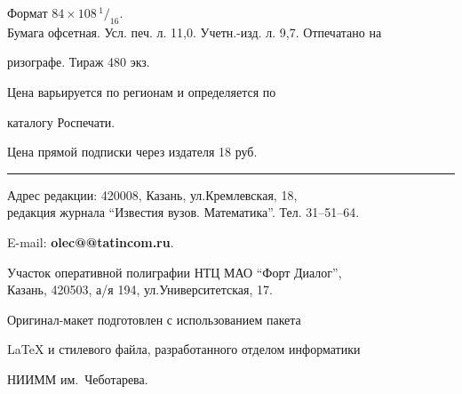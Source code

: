 Формат $84\times 108 \,^1/_{16}.$\\


Бумага офсетная. Усл. печ. л. 11,0. Учетн.-изд. л. 9,7. Отпечатано на 


ризографе. Тираж 480 экз. 





\noindent Цена варьируется по регионам и определяется по 


каталогу Роспечати. 





\noindent Цена прямой подписки через издателя 18 руб. 


\bigskip


\hrule


\bigskip


\noindent Адрес редакции: 420008, Казань, ул.Кремлевская, 18,\\  


редакция журнала  ``Известия вузов. Математика''. Тел. 31--51--64.





\noindent E-mail: {\bf olec@@tatincom.ru}. \par


\bigskip 


\noindent Участок оперативной полиграфии НТЦ МАО  ``Форт Диалог'', \\


Казань, 420503, а/я 194, ул.Университетская, 17. \par


\bigskip


\noindent Оригинал-макет подготовлен с использованием пакета


\AmS\LaTeX{} и стилевого файла, разработанного отделом информатики


НИИММ им.~Чеботарева.








